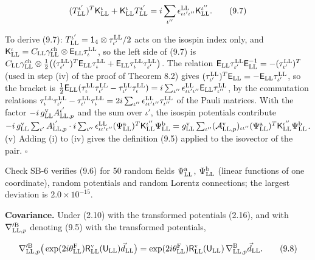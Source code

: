 \documentclass[
  10pt,
]{article}
\begin{document}
\[(T^{\iota'}_{\rm LL})^T\mathsf K^\iota_{\rm LL}+\mathsf K^\iota_{\rm LL}T^{\iota'}_{\rm LL}=i\sum_{\iota''}\epsilon^{\rm LL}_{\iota\iota'\iota''}\mathsf K^{\iota''}_{\rm LL}.\tag{9.7}\]

To derive (9.7):
\(T^{\iota'}_{\rm LL}=\mathsf 1_4\otimes\tau^{\rm LL}_{\iota'}/2\) acts
on the isospin index only, and
\(\mathsf K^\iota_{\rm LL}=C_{\rm LL}\gamma^{\rm ch}_{\rm LL}\otimes\mathsf E_{\rm LL}\tau^{\rm LL}_\iota\),
so the left side of (9.7) is
\(C_{\rm LL}\gamma^{\rm ch}_{\rm LL}\otimes\tfrac12\big((\tau^{\rm LL}_{\iota'})^T\mathsf E_{\rm LL}\tau^{\rm LL}_\iota+\mathsf E_{\rm LL}\tau^{\rm LL}_\iota\tau^{\rm LL}_{\iota'}\big)\).
The relation
\(\mathsf E_{\rm LL}\tau^{\rm LL}_{\iota'}\mathsf E^{-1}_{\rm LL}=-(\tau^{\rm LL}_{\iota'})^T\)
(used in step (iv) of the proof of Theorem 8.2) gives
\((\tau^{\rm LL}_{\iota'})^T\mathsf E_{\rm LL}=-\mathsf E_{\rm LL}\tau^{\rm LL}_{\iota'}\),
so the bracket is
\(\tfrac12\mathsf E_{\rm LL}(\tau^{\rm LL}_\iota\tau^{\rm LL}_{\iota'}-\tau^{\rm LL}_{\iota'}\tau^{\rm LL}_\iota)=i\sum_{\iota''}\epsilon^{\rm LL}_{\iota\iota'\iota''}\mathsf E_{\rm LL}\tau^{\rm LL}_{\iota''}\),
by the commutation relations
\(\tau^{\rm LL}_\iota\tau^{\rm LL}_{\iota'}-\tau^{\rm LL}_{\iota'}\tau^{\rm LL}_\iota=2i\sum_{\iota''}\epsilon^{\rm LL}_{\iota\iota'\iota''}\tau^{\rm LL}_{\iota''}\)
of the Pauli matrices. With the factor
\(-i\,g^{\rm v}_{\rm LL}A^{\iota'}_{{\rm LL},p}\) and the sum over
\(\iota'\), the isospin potentials contribute
\(-i\,g^{\rm v}_{\rm LL}\sum_{\iota'}A^{\iota'}_{{\rm LL},p}\cdot i\sum_{\iota''}\epsilon^{\rm LL}_{\iota\iota'\iota''}(\Psi^{\rm a}_{\rm LL})^T\mathsf K^{\iota''}_{\rm LL}\Psi^{\rm b}_{\rm LL}=g^{\rm v}_{\rm LL}\sum_{\iota''}(\mathcal A^{\rm v}_{{\rm LL},p})_{\iota\iota''}(\Psi^{\rm a}_{\rm LL})^T\mathsf K^{\iota''}_{\rm LL}\Psi^{\rm b}_{\rm LL}\).
(v) Adding (i) to (iv) gives the definition (9.5) applied to the
isovector of the pair. \(\square\)

Check SB-6 verifies (9.6) for 50 random fields
\(\Psi^{\rm a}_{\rm LL}\), \(\Psi^{\rm b}_{\rm LL}\) (linear functions
of one coordinate), random potentials and random Lorentz connections;
the largest deviation is \(2.0\times10^{-15}\).

\textbf{Covariance.} Under (2.10) with the transformed potentials
(2.16), and with \(\nabla'^{\rm B}_{{\rm LL},p}\) denoting (9.5) with
the transformed potentials,

\[\nabla'^{\rm B}_{{\rm LL},p}\big(\exp(2i\theta^{\rm F}_{\rm LL})\mathsf R^{\rm v}_{\rm LL}(\mathsf U_{\rm LL})\vec d_{\rm LL}\big)=\exp(2i\theta^{\rm F}_{\rm LL})\mathsf R^{\rm v}_{\rm LL}(\mathsf U_{\rm LL})\,\nabla^{\rm B}_{{\rm LL},p}\vec d_{\rm LL}.\tag{9.8}\]
\end{document}
